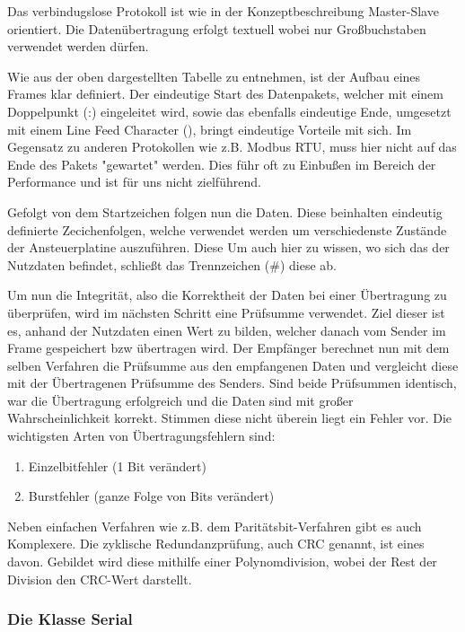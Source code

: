 Das verbindugslose Protokoll ist wie in der Konzeptbeschreibung Master-Slave orientiert. Die Datenübertragung erfolgt textuell wobei nur Großbuchstaben verwendet werden dürfen. \newline

Wie aus der oben dargestellten Tabelle zu entnehmen, ist der Aufbau eines Frames klar definiert. Der eindeutige Start des Datenpakets, welcher mit einem Doppelpunkt (:) eingeleitet wird, sowie das ebenfalls eindeutige Ende, umgesetzt mit einem Line Feed Character (\n),
bringt eindeutige Vorteile mit sich. Im Gegensatz zu anderen Protokollen wie z.B. Modbus RTU, muss hier nicht auf das Ende des Pakets "gewartet" werden. Dies führ oft zu Einbußen im Bereich der Performance und ist für uns nicht zielführend.\newline

Gefolgt von dem Startzeichen folgen nun die Daten. Diese beinhalten eindeutig definierte Zecichenfolgen, welche verwendet werden um verschiedenste Zustände der Ansteuerplatine auszuführen. Diese  Um auch hier zu wissen, wo sich das der Nutzdaten befindet, schließt das Trennzeichen (#) diese ab. \newline

Um nun die Integrität, also die Korrektheit der Daten bei einer Übertragung zu überprüfen, wird im nächsten Schritt eine Prüfsumme verwendet. Ziel dieser ist es, anhand der Nutzdaten einen Wert zu bilden, welcher danach vom Sender im Frame gespeichert bzw übertragen wird.
Der Empfänger berechnet nun mit dem selben Verfahren die Prüfsumme aus den empfangenen Daten und vergleicht diese mit der Übertragenen Prüfsumme des Senders. Sind beide Prüfsummen identisch, war die Übertragung erfolgreich und die Daten sind mit großer Wahrscheinlichkeit korrekt.
Stimmen diese nicht überein liegt ein Fehler vor. Die wichtigsten Arten von Übertragungsfehlern sind:
\begin{enumerate}
    \item Einzelbitfehler (1 Bit verändert)
    \item Burstfehler (ganze Folge von Bits verändert)
\end{enumerate}
Neben einfachen Verfahren wie z.B. dem Paritätsbit-Verfahren gibt es auch Komplexere. Die zyklische Redundanzprüfung, auch CRC genannt, ist eines davon. Gebildet wird diese mithilfe einer Polynomdivision, wobei der Rest der Division den CRC-Wert darstellt.


\subsubsection{Die Klasse Serial}
